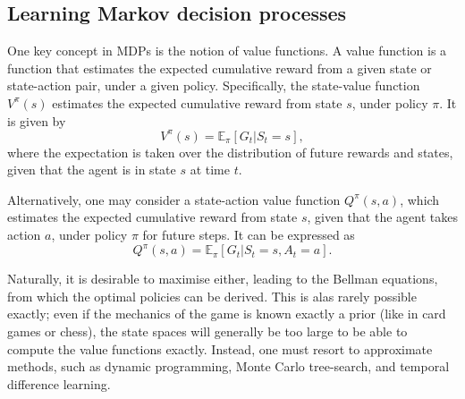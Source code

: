 \subsection{Learning Markov decision processes}
One key concept in MDPs is the notion of value functions.
A value function is a function that estimates the expected cumulative reward from a given state or state-action pair, under a given policy.
Specifically, the state-value function $V^{\pi}(s)$ estimates the expected cumulative reward from state $s$, under policy $\pi$.
It is given by
\begin{equation}
    V^{\pi}(s) = \mathbb{E}_\pi \left[ G_t | S_t = s \right],
\end{equation}
where the expectation is taken over the distribution of future rewards and states, given that the agent is in state $s$ at time $t$.

Alternatively, one may consider a state-action value function $Q^{\pi}(s, a)$, which estimates the expected cumulative reward from state $s$, given that the agent takes action $a$, under policy $\pi$ for future steps.
It can be expressed as
\begin{equation}
    Q^{\pi}(s, a) = \mathbb{E}_\pi \left[ G_t | S_t = s, A_t = a \right].
\end{equation}

Naturally, it is desirable to maximise either, leading to the Bellman equations, from which the optimal policies can be derived.
This is alas rarely possible exactly; even if the mechanics of the game is known exactly a prior (like in card games or chess), the state spaces will generally be too large to be able to compute the value functions exactly.
Instead, one must resort to approximate methods, such as dynamic programming, Monte Carlo tree-search, and temporal difference learning.

